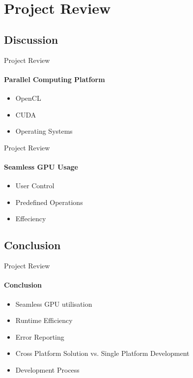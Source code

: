 \section{Project Review}

	\subsection{Discussion}
	\begin{frame}[t]{Project Review}\framesubtitle{Parallel Computing Platform}
		\begin{itemize}
			\item OpenCL
			\item CUDA
			\item Operating Systems
		\end{itemize}
	\end{frame}

	\begin{frame}[t]{Project Review}\framesubtitle{Seamless GPU Usage}
		\begin{itemize}
			\item User Control
			\item Predefined Operations
			\item Effeciency
		\end{itemize}
	\end{frame}

	\subsection{Conclusion}
	\begin{frame}[t]{Project Review}\framesubtitle{Conclusion}
		\begin{itemize}
			\item Seamless GPU utilisation
			\item Runtime Efficiency
			\item Error Reporting
			\item Cross Platform Solution vs. Single Platform Development 
			\item Development Process
		\end{itemize}
	\end{frame}

